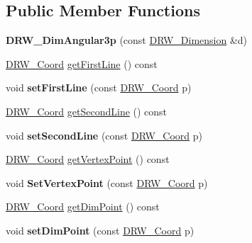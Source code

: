 \subsection*{Public Member Functions}
\begin{DoxyCompactItemize}
\item 
\hypertarget{classDRW__DimAngular3p_a1fa4d8fe38b64021633b7089fc2c1125}{{\bfseries D\-R\-W\-\_\-\-Dim\-Angular3p} (const \hyperlink{classDRW__Dimension}{D\-R\-W\-\_\-\-Dimension} \&d)}\label{classDRW__DimAngular3p_a1fa4d8fe38b64021633b7089fc2c1125}

\item 
\hyperlink{classDRW__Coord}{D\-R\-W\-\_\-\-Coord} \hyperlink{classDRW__DimAngular3p_a4b103b2e28a3f942f105118a84fffbb4}{get\-First\-Line} () const 
\item 
\hypertarget{classDRW__DimAngular3p_af5c40ea3d42eb6717c7400883e1b7bc1}{void {\bfseries set\-First\-Line} (const \hyperlink{classDRW__Coord}{D\-R\-W\-\_\-\-Coord} p)}\label{classDRW__DimAngular3p_af5c40ea3d42eb6717c7400883e1b7bc1}

\item 
\hyperlink{classDRW__Coord}{D\-R\-W\-\_\-\-Coord} \hyperlink{classDRW__DimAngular3p_aa240abbba2c8ce180e23c93e29ec604e}{get\-Second\-Line} () const 
\item 
\hypertarget{classDRW__DimAngular3p_abb85ccdc296e0bbc8e7b7d1d4179c7ae}{void {\bfseries set\-Second\-Line} (const \hyperlink{classDRW__Coord}{D\-R\-W\-\_\-\-Coord} p)}\label{classDRW__DimAngular3p_abb85ccdc296e0bbc8e7b7d1d4179c7ae}

\item 
\hyperlink{classDRW__Coord}{D\-R\-W\-\_\-\-Coord} \hyperlink{classDRW__DimAngular3p_a331a4f869b667c46405c066eb819669e}{get\-Vertex\-Point} () const 
\item 
\hypertarget{classDRW__DimAngular3p_ada406a1c04becd894f8737729746f344}{void {\bfseries Set\-Vertex\-Point} (const \hyperlink{classDRW__Coord}{D\-R\-W\-\_\-\-Coord} p)}\label{classDRW__DimAngular3p_ada406a1c04becd894f8737729746f344}

\item 
\hyperlink{classDRW__Coord}{D\-R\-W\-\_\-\-Coord} \hyperlink{classDRW__DimAngular3p_abb2ea0c545d83aafbcc2d58b9ba959be}{get\-Dim\-Point} () const 
\item 
\hypertarget{classDRW__DimAngular3p_aee13dd8b678eedf27e1a66558d0065d6}{void {\bfseries set\-Dim\-Point} (const \hyperlink{classDRW__Coord}{D\-R\-W\-\_\-\-Coord} p)}\label{classDRW__DimAngular3p_aee13dd8b678eedf27e1a66558d0065d6}

\end{DoxyCompactItemize}
